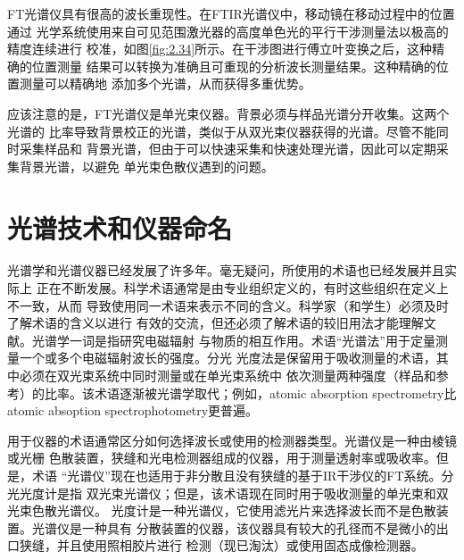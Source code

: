 FT光谱仪具有很高的波长重现性。在FTIR光谱仪中，移动镜在移动过程中的位置通过
光学系统使用来自可见范围激光器的高度单色光的平行干涉测量法以极高的精度连续进行
校准，如图\ref{fig:2.34}所示。在干涉图进行傅立叶变换之后，这种精确的位置测量
结果可以转换为准确且可重现的分析波长测量结果。这种精确的位置测量可以精确地
添加多个光谱，从而获得多重优势。

应该注意的是，FT光谱仪是单光束仪器。背景必须与样品光谱分开收集。这两个光谱的
比率导致背景校正的光谱，类似于从双光束仪器获得的光谱。尽管不能同时采集样品和
背景光谱，但由于可以快速采集和快速处理光谱，因此可以定期采集背景光谱，以避免
单光束色散仪遇到的问题。
\section{光谱技术和仪器命名}
光谱学和光谱仪器已经发展了许多年。毫无疑问，所使用的术语也已经发展并且实际上
正在不断发展。科学术语通常是由专业组织定义的，有时这些组织在定义上不一致，从而
导致使用同一术语来表示不同的含义。科学家（和学生）必须及时了解术语的含义以进行
有效的交流，但还必须了解术语的较旧用法才能理解文献。光谱学一词是指研究电磁辐射
与物质的相互作用。术语“光谱法”用于定量测量一个或多个电磁辐射波长的强度。分光
光度法是保留用于吸收测量的术语，其中必须在双光束系统中同时测量或在单光束系统中
依次测量两种强度（样品和参考）的比率。该术语逐渐被光谱学取代；例如，atomic
absorption spectrometry比atomic absoption spectrophotometry更普遍。

用于仪器的术语通常区分如何选择波长或使用的检测器类型。光谱仪是一种由棱镜或光栅
色散装置，狭缝和光电检测器组成的仪器，用于测量透射率或吸收率。但是，术语
“光谱仪”现在也适用于非分散且没有狭缝的基于IR干涉仪的FT系统。分光光度计是指
双光束光谱仪；但是，该术语现在同时用于吸收测量的单光束和双光束色散光谱仪。
光度计是一种光谱仪，它使用滤光片来选择波长而不是色散装置。光谱仪是一种具有
分散装置的仪器，该仪器具有较大的孔径而不是微小的出口狭缝，并且使用照相胶片进行
检测（现已淘汰）或使用固态成像检测器。
\newpage
